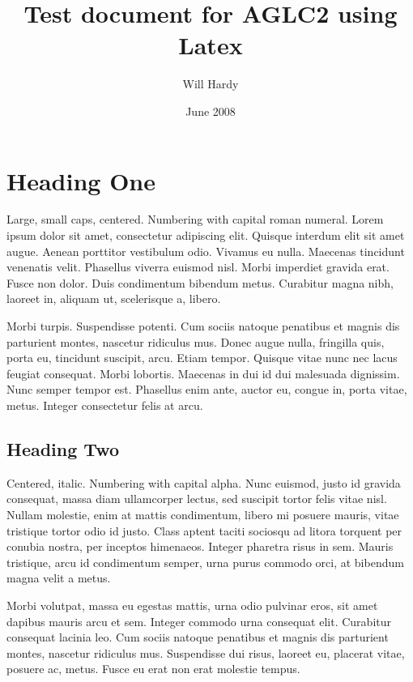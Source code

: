 \documentclass[titlepage,11pt]{lawessay}
\title{Test document for AGLC2 using Latex}
\author{Will Hardy}
\date{June 2008}
\begin{document}
\maketitle
\tableofcontents
\newpage


\section{Heading One}Large, small caps, centered. Numbering with capital roman numeral.
Lorem ipsum dolor sit amet, consectetur adipiscing elit. Quisque interdum elit sit amet augue. Aenean porttitor vestibulum odio. Vivamus eu nulla. Maecenas tincidunt venenatis velit. Phasellus viverra euismod nisl. Morbi imperdiet gravida erat. Fusce non dolor. Duis condimentum bibendum metus. Curabitur magna nibh, laoreet in, aliquam ut, scelerisque a, libero. 

Morbi turpis. Suspendisse potenti. Cum sociis natoque penatibus et magnis dis parturient montes, nascetur ridiculus mus. Donec augue nulla, fringilla quis, porta eu, tincidunt suscipit, arcu. Etiam tempor. Quisque vitae nunc nec lacus feugiat consequat. Morbi lobortis. Maecenas in dui id dui malesuada dignissim. Nunc semper tempor est. Phasellus enim ante, auctor eu, congue in, porta vitae, metus. Integer consectetur felis at arcu.

\subsection{Heading Two}Centered, italic. Numbering with capital alpha.
Nunc euismod, justo id gravida consequat, massa diam ullamcorper lectus, sed suscipit tortor felis vitae nisl. Nullam molestie, enim at mattis condimentum, libero mi posuere mauris, vitae tristique tortor odio id justo. Class aptent taciti sociosqu ad litora torquent per conubia nostra, per inceptos himenaeos. Integer pharetra risus in sem. Mauris tristique, arcu id condimentum semper, urna purus commodo orci, at bibendum magna velit a metus. 

Morbi volutpat, massa eu egestas mattis, urna odio pulvinar eros, sit amet dapibus mauris arcu et sem. Integer commodo urna consequat elit. Curabitur consequat lacinia leo. Cum sociis natoque penatibus et magnis dis parturient montes, nascetur ridiculus mus. Suspendisse dui risus, laoreet eu, placerat vitae, posuere ac, metus. Fusce eu erat non erat molestie tempus. 
\end{document}
